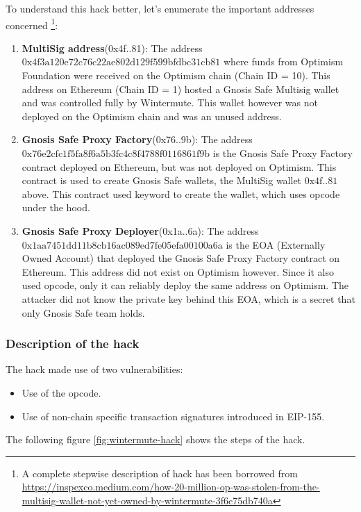 To understand this hack better, let's enumerate the important addresses concerned \footnote{A complete stepwise description of hack has been borrowed from \href{https://inspexco.medium.com/how-20-million-op-was-stolen-from-the-multisig-wallet-not-yet-owned-by-wintermute-3f6c75db740a}{https://inspexco.medium.com/how-20-million-op-was-stolen-from-the-multisig-wallet-not-yet-owned-by-wintermute-3f6c75db740a}}:
\begin{enumerate}
    \item \textbf{MultiSig address}(0x4f..81): The address $\text{0x4f3a120e72c76c22ae802d129f599bfdbc31cb81}$ where funds from Optimism Foundation were received on the Optimism chain (Chain ID = 10). This address on Ethereum (Chain ID = 1) hosted a Gnosis Safe Multisig wallet and was controlled fully by Wintermute. This wallet however was not deployed on the Optimism chain and was an unused address.
    \item \textbf{Gnosis Safe Proxy Factory}(0x76..9b): The address $\text{0x76e2cfc1f5fa8f6a5b3fc4c8f4788f0116861f9b}$ is the Gnosis Safe Proxy Factory contract deployed on Ethereum, but was not deployed on Optimism. This contract is used to create Gnosis Safe wallets, the MultiSig wallet $\text{0x4f..81}$ above. This contract used  keyword to create the wallet, which uses  opcode under the hood.
    \item \textbf{Gnosis Safe Proxy Deployer}(0x1a..6a): The address $\text{0x1aa7451dd11b8cb16ac089ed7fe05efa00100a6a}$ is the EOA (Externally Owned Account) that deployed the Gnosis Safe Proxy Factory contract on Ethereum. This address did not exist on Optimism however. Since it also used  opcode, only it can reliably deploy the same address on Optimism. The attacker did not know the private key behind this EOA, which is a secret that only Gnosis Safe team holds.
\end{enumerate}

\subsubsection{Description of the hack}
The hack made use of two vulnerabilities:
\begin{itemize}
    \item Use of the  opcode.
    \item Use of non-chain specific transaction signatures introduced in EIP-155.
\end{itemize}
The following figure \ref{fig:wintermute-hack} shows the steps of the hack.

